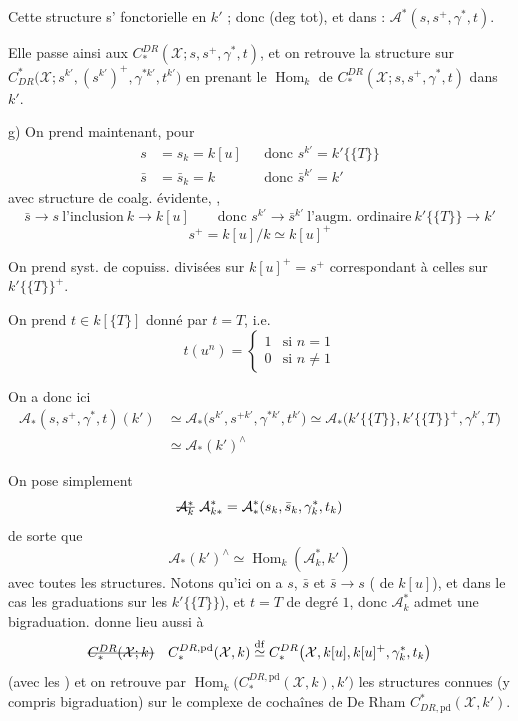 \documentclass[11pt,a4paper]{article}
\begin{document}
Cette structure s' \struck{\ill{}}
fonctorielle en $k'$ ; donc \ill{} (deg tot), et dans \ill{} :
$\mathcal{A}^*(s,s^+,\gamma^*,t)$.

Elle passe \ill{} \ill{} ainsi aux $C^{DR}_*(\mathcal{X};s,s^+,\gamma^*,t)$, et
on retrouve la structure \ill{} sur
$C^*_{DR}\bigl(\mathcal{X};s^{k'},(s^{k'})^+,\gamma^{*k'},t^{k'}\bigr)$ en
prenant le $\operatorname{Hom}_k$ \ill{} de
$C^{DR}_*(\mathcal{X};s,s^+,\gamma^*,t)$ dans $k'$.

g) On prend maintenant, pour
\begin{align*}
  s&=s_k=k[u] &&\text{donc } s^{k'}=k'\{\{T\}\}\\
  \bar s&=\bar s_k=k &&\text{donc } \bar s^{k'}=k'
\end{align*}
avec structure de coalg. évidente, ,
\[
  \bar s\longrightarrow s \ \text{l'inclusion}\ k\to k[u]
  \qquad\text{donc } s^{k'}\to\bar s^{k'}\ \text{l'augm. ordinaire}\
  k'\{\{T\}\}\to k'
\]
\[
  s^+=k[u]/k\simeq k[u]^+
\]

On prend syst. de copuiss. divisées sur $k[u]^+=s^+$ 
correspondant à celles \struck{\ill{}} sur $k'\{\{T\}\}^+$.

On prend $t\in k[\{T\}]$ donné par $t=T$, i.e.
\[
  t(u^n)=\begin{cases}1 & \text{si } n=1\\ 0 & \text{si } n\neq1\end{cases}
\]

On a donc ici
\begin{align*}
  \mathcal{A}_*(s,s^+,\gamma^*,t)(k')
  &\simeq\mathcal{A}_*\bigl(s^{k'},s^{+k'},\gamma^{*k'},t^{k'}\bigr)
   \simeq\mathcal{A}_*\bigl(k'\{\{T\}\},k'\{\{T\}\}^+,\gamma^{k'},T\bigr)\\
  &\simeq\mathcal{A}_*(k')^{\wedge}
\end{align*}

On pose simplement
\[
  \text{\struck{$\mathcal{A}_k^{*}$}}\ \mathcal{A}^{*}_{k*}
  =\mathcal{A}^{*}_{*}(s_k,\bar s_k,\gamma_k^{*},t_k)
\]
de sorte que
\[
  \mathcal{A}_*(k')^{\wedge}\simeq\operatorname{Hom}_k(\mathcal{A}^{*}_{k},k')
\]
avec toutes les structures. Notons qu'ici on a $s$, $\bar s$ et
$\bar s\to s$  (\ill{} \ill{} de $k[u]$), et dans le cas \ill{}
les graduations \ill{} sur les $k'\{\{T\}\}$), et $t=T$ de degré $1$, donc
\struck{on a} $\mathcal{A}^{*}_{k}$ admet une bigraduation. \add{Cela}
\struck{$\mathcal{A}^*_k$} donne lieu aussi à
\[
  \text{\struck{$C^{DR}_*(\mathcal{X};k)$}}\quad
  C^{DR,\mathrm{pd}}_*(\mathcal{X},k)\overset{\mathrm{df}}{\simeq}
  C^{DR}_*\bigl(\mathcal{X},k[u],k[u]^+,\gamma^{*}_k,t_k\bigr)
\]
(avec les ) et on retrouve par
$\operatorname{Hom}_k\bigl(C^{DR,\mathrm{pd}}_*(\mathcal{X},k),k'\bigr)$ les
structures connues (y compris \add{la} bigraduation) sur le complexe de
cochaînes de De Rham $C^*_{DR,\mathrm{pd}}(\mathcal{X},k')$.
\end{document}
